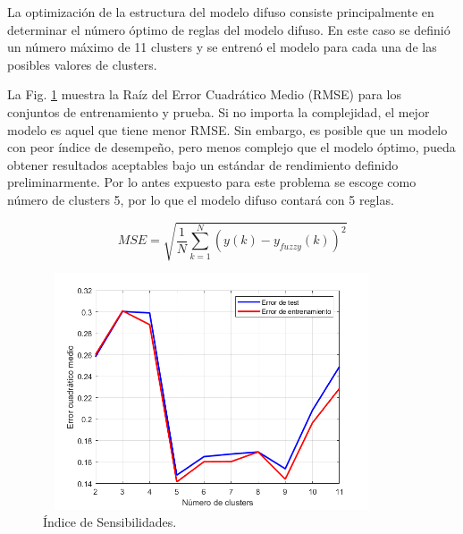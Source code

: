 \documentclass[12pt]{article}
\begin{document}
La optimización de la estructura del modelo difuso consiste principalmente en determinar el número óptimo de reglas del modelo difuso. En este caso se definió un número máximo de 11 clusters y se entrenó el modelo para cada una de las posibles valores de clusters.

La Fig. \ref{f_P1reglas11} muestra la Raíz del Error Cuadrático Medio (RMSE) para los conjuntos de entrenamiento y prueba.  Si no importa la complejidad, el mejor modelo es aquel que
tiene menor RMSE. Sin embargo, es posible que un modelo con peor índice de
desempeño, pero menos complejo que el modelo óptimo, pueda obtener resultados
aceptables bajo un estándar de rendimiento definido preliminarmente. Por lo antes expuesto para este problema se escoge como número de clusters 5, por lo que el modelo difuso contará con 5 reglas.

\begin{equation}
MSE=\sqrt{\frac{1}{N}\sum_{k=1}^{N}(y(k)-y_{fuzzy}(k))^2}
\label{e_RMSE}
\end{equation}



\begin{figure}
\centering
\includegraphics[width=10cm,height=7cm]{imag/P1reglas11}
\caption{Índice de Sensibilidades.}
\label{f_P1reglas11}
\end{figure}
\end{document}
